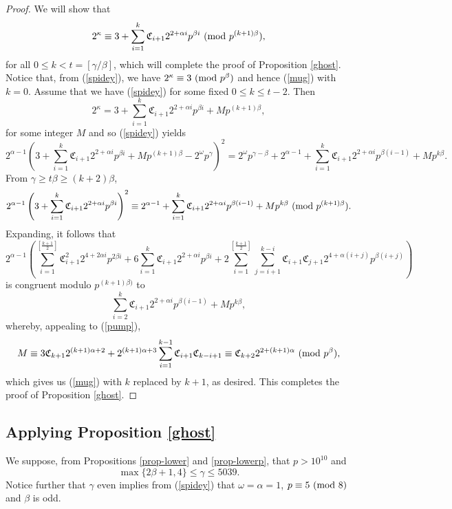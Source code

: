 \documentclass{amsart}
\def\mod#1{{\ifmmode\text{\rm\ (mod~$#1$)}
\else\discretionary{}{}{\hbox{ }}\rm(mod~$#1$)\fi}}
\begin{document}
{\begin{proof}
We will show that 
\begin{equation} \label{mug}
2^\kappa \equiv  3 + \sum_{i=1}^{k} \mathfrak{C}_{i+1} 2^{2+\alpha i} p^{\beta i} \mod{p^{(k+1)\beta}},
\end{equation}
for all $0 \leq k < t=\left[ \gamma/\beta \right]$, which will complete the proof of Proposition \ref{ghost}. Notice that, from (\ref{spidey}), we have $2^\kappa \equiv 3 \mod{p^\beta}$ and hence (\ref{mug}) with $k=0$. Assume that we have (\ref{spidey}) for some fixed $0 \leq k \leq t-2$. Then 
$$
2^\kappa =  3 + \sum_{i=1}^{k} \mathfrak{C}_{i+1} 2^{2+\alpha i} p^{\beta i} +M p^{(k+1)\beta},
$$
for some integer $M$ and so (\ref{spidey}) yields
$$
2^{\alpha-1} (3+\sum_{i=1}^{k} \mathfrak{C}_{i+1} 2^{2+\alpha i} p^{\beta i} +M p^{(k+1)\beta}-2^\omega p^\gamma)^2 = 2^\omega p^{\gamma-\beta} +2^{\alpha-1} + \sum_{i=1}^{k} \mathfrak{C}_{i+1} 2^{2+\alpha i} p^{\beta (i-1)} +M p^{k\beta}.
$$
From $\gamma \geq t \beta \geq (k+2)\beta$,
$$
2^{\alpha-1} \left( 3+\sum_{i=1}^{k} \mathfrak{C}_{i+1} 2^{2+\alpha i} p^{\beta i} \right)^2 \equiv 2^{\alpha-1} + \sum_{i=1}^{k} \mathfrak{C}_{i+1} 2^{2+\alpha i} p^{\beta (i-1)} +M p^{k\beta}
\mod{p^{(k+1)\beta}}.
$$
Expanding, it follows that 
$$
2^{\alpha-1} \left( \sum_{i=1}^{\left[ \frac{k+1}{2} \right]} \mathfrak{C}_{i+1}^2 2^{4+2\alpha i} p^{2\beta i}  + 6 \sum_{i=1}^{k} \mathfrak{C}_{i+1} 2^{2+\alpha i} p^{\beta i} +  2 \sum_{i=1}^{\left[ \frac{k+1}{2} \right]}  \sum_{j=i+1}^{k-i} \mathfrak{C}_{i+1} \mathfrak{C}_{j+1} 2^{4+\alpha (i+j)} p^{\beta (i+j)}  \right)
$$
is congruent modulo $p^{(k+1)\beta)}$ to
$$
 \sum_{i=2}^{k} \mathfrak{C}_{i+1} 2^{2+\alpha i} p^{\beta (i-1)} +M p^{k\beta},
$$
whereby, appealing to (\ref{pump}),
$$
M \equiv 3 \mathfrak{C}_{k+1} 2^{(k+1)\alpha+2}
+ 2^{(k+1)\alpha+3}  \sum_{i=1}^{k-1}   \mathfrak{C}_{i+1} \mathfrak{C}_{k-i+1}
\equiv \mathfrak{C}_{k+2} 2^{2+(k+1)\alpha}  \mod{p^\beta},
$$
which gives us (\ref{mug}) with $k$ replaced by $k+1$, as desired. 
This completes the proof of Proposition \ref{ghost}.
\end{proof}

\subsection{Applying Proposition \ref{ghost}}
 
 We suppose, from Propositions \ref{prop-lower} and \ref{prop-lowerp}, that $p > 10^{10}$ and 
$$
\max \{ 2 \beta+1, 4 \} \leq \gamma \leq 5039.
$$
Notice further that $\gamma$ even implies from (\ref{spidey}) that $\omega=\alpha=1$, $p \equiv 5 \mod{8}$ and $\beta$ is odd.
 
}
\end{document}
